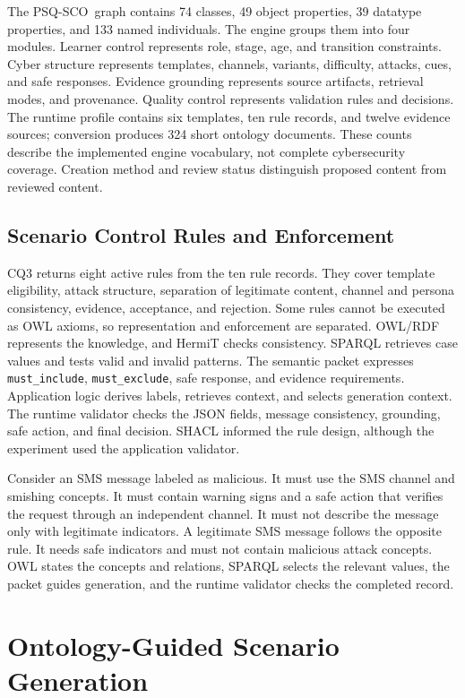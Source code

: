 \documentclass[runningheads]{llncs}
\newcommand{\sco}{PSQ-SCO}
\begin{document}
The \sco\ graph contains 74 classes, 49 object properties, 39 datatype
properties, and 133 named individuals. The engine groups them into four modules.
Learner control represents role, stage, age, and transition constraints. Cyber
structure represents templates, channels, variants, difficulty, attacks, cues,
and safe responses. Evidence grounding represents source artifacts, retrieval
modes, and provenance. Quality control represents validation rules and decisions.
The runtime profile contains six templates, ten rule records, and twelve evidence
sources; conversion produces 324 short ontology documents. These counts describe
the implemented engine vocabulary, not complete cybersecurity coverage. Creation
method and review status distinguish proposed content from reviewed content.

\subsection{Scenario Control Rules and Enforcement}

CQ3 returns eight active rules from the ten rule records. They cover template
eligibility, attack structure, separation of legitimate content, channel and
persona consistency, evidence, acceptance, and rejection. Some rules cannot be
executed as OWL axioms, so representation and enforcement are separated.
OWL/RDF represents the knowledge, and HermiT checks consistency. SPARQL retrieves
case values and tests valid and invalid patterns. The semantic packet expresses
\texttt{must\_include}, \texttt{must\_exclude}, safe response, and evidence
requirements. Application logic derives labels, retrieves context, and selects
generation context. The runtime validator checks the JSON fields,
message consistency, grounding, safe action, and final decision. SHACL informed
the rule design, although the experiment used the application validator.

Consider an SMS message labeled as malicious. It must use the SMS channel and
smishing concepts. It must contain warning signs and a safe action that verifies
the request through an independent channel. It must not describe the message only
with legitimate indicators. A legitimate SMS message follows the opposite rule.
It needs safe indicators and must not contain malicious attack concepts. OWL
states the concepts and relations, SPARQL selects the relevant values, the packet
guides generation, and the runtime validator checks the completed record.

\section{Ontology-Guided Scenario Generation}
\end{document}
